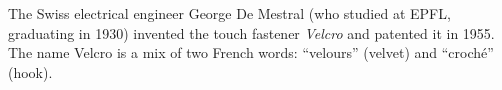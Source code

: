 The Swiss electrical engineer George De Mestral (who studied at EPFL, graduating in 1930) invented the touch fastener \emph{Velcro} and patented it in 1955.
The name Velcro is a mix of two French words: ``velours'' (velvet) and ``croché'' (hook).